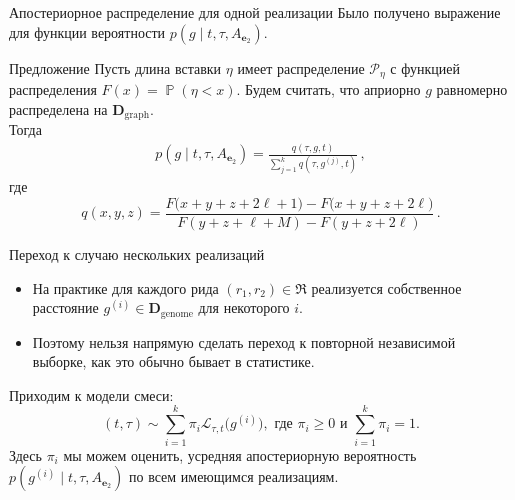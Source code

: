\documentclass[unicode, notheorems]{beamer}
\DeclareMathOperator{\Prb}{\mathbb{P}}
\begin{document}
\begin{frame}{Апостериорное распределение для одной реализации}
Было получено выражение для функции вероятности $p(g \mid t, \tau, A_{\mathbf{e}_2})$.
\begin{block}{Предложение}
	Пусть длина вставки $\eta$ имеет распределение $\mathcal{P}_\eta$ с функцией распределения $F(x) = \Prb(\eta < x)$. Будем считать, что априорно $g$ равномерно распределена на $\mathbf{D}_{\mathrm{graph}}$.\\
	\medskip
	Тогда
	\begin{equation*}
	\begin{gathered}
	p(g \mid t, \tau,  A_{\mathbf{e}_2}) =  \frac{q(\tau, g, t)}{\sum_{j=1}^k q(\tau, g^{(j)}, t)}	\,,
	\end{gathered}
	\end{equation*}
	где
	\begin{equation*}
		q(x, y, z)  = \frac{F\big(x+y+z+2\ell+1\big) - F\big(x+y+z+2\ell\big)}{F( y + z + \ell + M) - F(y + z + 2\ell)}\,.
	\end{equation*}
\end{block}
\end{frame}

\begin{frame}{Переход к случаю нескольких реализаций}
	\begin{itemize}
		\item На практике для каждого рида  $(r_1, r_2) \in \mathfrak{R}$ реализуется собственное расстояние $g^{(i)} \in \mathbf{D}_{\mathrm{genome}}$ для некоторого $i$.
		\item Поэтому нельзя напрямую сделать переход к повторной независимой выборке, как это обычно бывает в статистике.
	\end{itemize}
	\medskip
	Приходим к {\color{blue} модели смеси}:
	\begin{equation*}
		(t, \tau) \sim \sum_{i=1}^k \pi_i  \mathcal{L}_{\tau, t} \big(g^{(i)}\big), \text{ где } \pi_i \ge 0 \text{ и } \sum_{i=1}^k \pi_i = 1.
	\end{equation*}
	Здесь $\pi_i$ мы можем оценить, усредняя апостериорную вероятность $p(g^{(i)} \mid t, \tau, A_{\mathbf{e}_2})$ по всем имеющимся реализациям.
\end{frame}
\end{document}
